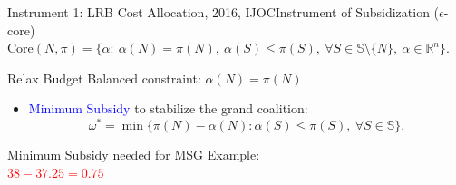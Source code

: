 \documentclass[14pt]{beamer}
\newcommand{\R}{\mathbb{R}}
\begin{document}
\begin{frame}{Instrument 1: LRB Cost Allocation, {\footnotesize 2016, IJOC}}{Instrument of Subsidization ($\epsilon$-core)}
\vspace{3mm}
{\footnotesize $\mathrm{Core}(N,\pi) = \bigg\{ \alpha:~ \alpha(N)=\pi(N), ~\alpha(S) \leq \pi(S), ~\forall S \in \mathbb{S} \setminus \{N\},~\alpha \in \R^n   \bigg\}$.}

\begin{shaded}
\centering Relax Budget Balanced constraint: $\alpha(N) = \pi(N)$
\end{shaded}
\begin{itemize}
\item \textcolor{blue}{Minimum Subsidy} to stabilize the grand coalition:
\begin{equation*}
\omega^* = \min \big\{ \pi(N) - \alpha(N): \alpha(S) \leq \pi(S), ~\forall S \in \mathbb{S} \big\}.
\end{equation*}
\end{itemize}
\pause
\vspace{-7mm}
\begin{shaded}
\centering
\small
Minimum Subsidy needed for MSG Example:\\
\vspace{2mm}
\textcolor{red}{$38-37.25 = 0.75$}
\end{shaded}
\end{frame}
\end{document}
